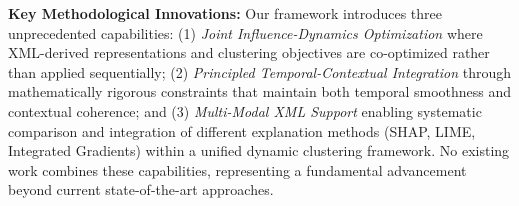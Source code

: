 \documentclass[final,authoryear,3p,times,review,sort&compress]{elsarticle}
\begin{document}
\begin{table}[t!]
\centering
\caption{Systematic Comparison with Existing Approaches. Our framework is the first to address all key dimensions simultaneously.}
\label{tab:comparison_existing_work}
\end{table}

\textbf{Key Methodological Innovations:} Our framework introduces three unprecedented capabilities: (1) \textit{Joint Influence-Dynamics Optimization} where XML-derived representations and clustering objectives are co-optimized rather than applied sequentially; (2) \textit{Principled Temporal-Contextual Integration} through mathematically rigorous constraints that maintain both temporal smoothness and contextual coherence; and (3) \textit{Multi-Modal XML Support} enabling systematic comparison and integration of different explanation methods (SHAP, LIME, Integrated Gradients) within a unified dynamic clustering framework. No existing work combines these capabilities, representing a fundamental advancement beyond current state-of-the-art approaches.
\end{document}
